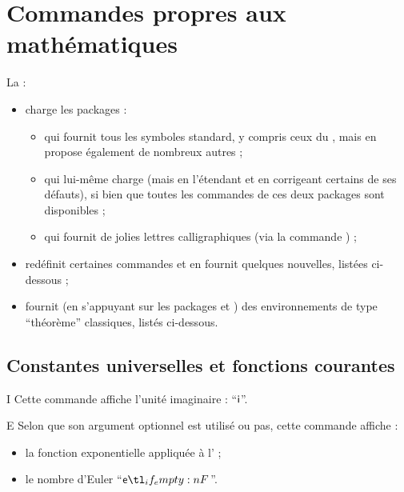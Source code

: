 \documentclass[french,nolocaltoc]{nwejmart}
\newtheorem[title=Fait,style=definition]{fact}
\begin{document}
\section{Commandes propres aux mathématiques}
\label{sec:comm-propr-aux}

La \nwejmauthorcl{} :
\begin{itemize}
\item charge les packages :
  \begin{itemize}
  \item {} qui fournit tous les symboles standard, y compris
    ceux du , mais en propose également de nombreux autres ;
  \item {} qui lui-même charge  (mais en
    l'étendant et en corrigeant certains de ses défauts), si bien que toutes les
    commandes de ces deux packages sont disponibles ;
  \item {} qui fournit de jolies lettres calligraphiques (via
    la commande ) ;
  \end{itemize}
\item redéfinit certaines commandes et en fournit quelques nouvelles, listées
  ci-dessous ;
\item fournit (en s'appuyant sur les packages  et
  ) des environnements de type \enquote{théorème} classiques,
  listés ci-dessous.
\end{itemize}

\subsection{Constantes universelles et fonctions courantes}

\begin{docCommand}{I}{}
  Cette commande affiche l'unité imaginaire : \enquote{$\mathsf{i}$}.
\end{docCommand}

\begin{docCommand}{E}{}
 Selon que son argument optionnel est utilisé ou pas, cette commande affiche :
  \begin{itemize}
  \item la fonction exponentielle appliquée à l' ;
  \item le nombre d'Euler \enquote{$\E$}.
  \end{itemize}
\end{docCommand}
\end{document}
